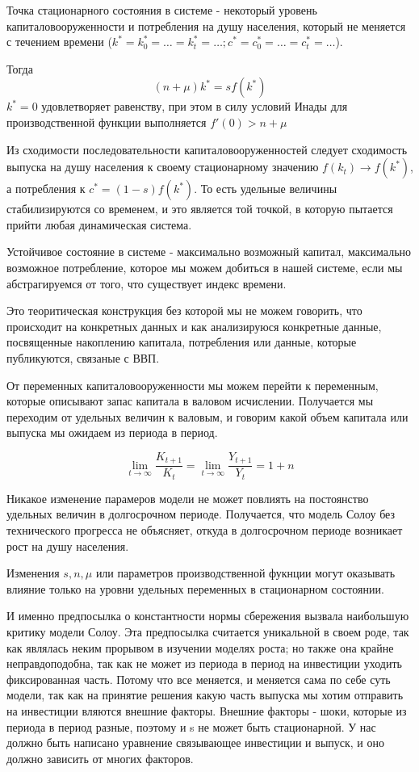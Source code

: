 \documentclass[reqno]{article}
\theoremstyle{definition}
\theoremstyle{definition}
\theoremstyle{definition}
\theoremstyle{definition}
\theoremstyle{definition}
\theoremstyle{definition}
\theoremstyle{definition}
\theoremstyle{definition}
\theoremstyle{definition}
\begin{document}
		Точка стационарного состояния в системе - некоторый уровень капиталовооруженности и потребления на душу населения, который не меняется с течением времени ($k^* = k_0^* = \dots = k_t^* = \dots; c^* = c_0^* = \dots = c_t^* = \dots$). 
		
		Тогда $$(n + \mu) k^* = s f(k^*)$$
		$k^*=0$ удовлетворяет равенству, при этом в силу условий Инады для производственной функции выполняется $f'(0) > n + \mu$
		
		Из сходимости последовательности капиталовооруженностей следует сходимость выпуска на душу населения к своему стационарному значению $f(k_t) \rightarrow f(k^*)$, а потребления к $c^* = (1-s)f(k^*)$. То есть удельные величины стабилизируются со временем, и это является той точкой, в которую пытается прийти любая динамическая система. 
		
		Устойчивое состояние в системе - максимально возможный капитал, максимально возможное потребление, которое мы можем добиться в нашей системе, если мы абстрагируемся от того, что существует индекс времени.
		
		Это теоритическая конструкция без которой мы не можем говорить, что происходит на конкретных данных и как анализируюся конкретные данные, посвященные накоплению капитала, потребления или данные, которые публикуются, связаные с ВВП.\bigskip
		
		От переменных капиталовооруженности мы можем перейти к переменным, которые описывают запас капитала в валовом исчислении. Получается мы переходим от удельных величин к валовым, и говорим какой объем капитала или выпуска мы ожидаем из периода в период. 
		
		$$\lim_{t \rightarrow \infty} \frac{K_{t+1}}{K_t} = \lim_{t \rightarrow \infty} \frac{Y_{t+1}}{Y_t} = 1 + n$$
		
		Никакое изменение парамеров модели не может повлиять на постоянство удельных величин в долгосрочном периоде. Получается, что модель Солоу без технического прогресса не объясняет, откуда в долгосрочном периоде возникает рост на душу населения.
		
		Изменения $s,n,\mu$ или параметров производственной фукнции могут оказывать влияние только на уровни удельных переменных в стационарном состоянии.
		
		И именно предпосылка о константности нормы сбережения вызвала наибольшую критику модели Солоу. Эта предпосылка считается уникальной в своем роде, так как являлась неким прорывом в изучении моделях роста; но также она крайне неправдоподобна, так как не может из периода в период на инвестиции уходить фиксированная часть. Потому что все меняется, и меняется сама по себе суть модели, так как на принятие решения какую часть выпуска мы хотим отправить на инвестиции вляются внешние факторы. Внешние факторы - шоки, которые из периода в период разные, поэтому и s не может быть стационарной. У нас должно быть написано уравнение связывающее инвестиции и выпуск, и оно должно зависить от многих факторов.
		
\end{document}
